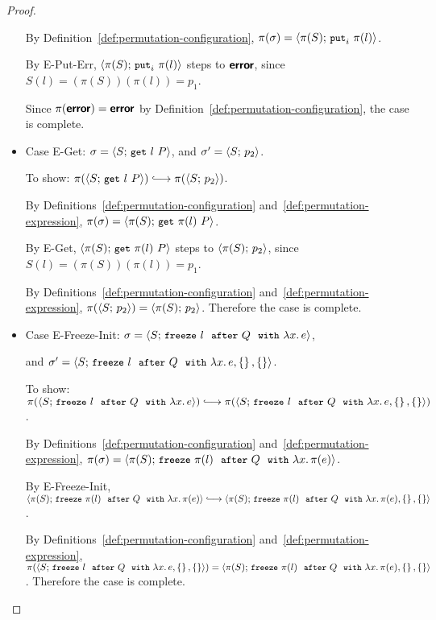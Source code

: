 \begin{proof}
\begin{itemize}
      By Definition~\ref{def:permutation-configuration}, $\pi(\sigma) =
      \langle \pi(S);\, \mbox{\small{\texttt{put}}}_i~\pi(l) \rangle$.

      By {\sc E-Put-Err}, $\langle \pi(S);\, \mbox{\small{\texttt{put}}}_i~\pi(l) \rangle$ steps to
      $\textbf{\textsf{error}}$, since $S(l) = (\pi(S))(\pi(l)) = p_1$.

      Since $\pi(\textbf{\textsf{error}}) = \textbf{\textsf{error}}$ by
      Definition~\ref{def:permutation-configuration}, the case is
      complete.
    \item Case {\sc E-Get}: $\sigma = \langle S;\, \mbox{\small{\texttt{get}}}~l~P \rangle$, and
      $\sigma' = \langle S;\, p_2 \rangle$.

      To show: $\pi(\config{S}{\getexp{l}{P}}) \parstepsto
      \pi(\config{S}{p_2})$.

      By Definitions~\ref{def:permutation-configuration}
      and~\ref{def:permutation-expression}, $\pi(\sigma) =
      \langle \pi(S);\, \mbox{\small{\texttt{get}}}~\pi(l)~P \rangle$.

      By {\sc E-Get}, $\langle \pi(S);\, \mbox{\small{\texttt{get}}}~\pi(l)~P \rangle$ steps to
      $\langle \pi(S);\, p_2 \rangle$, since $S(l) = (\pi(S))(\pi(l)) = p_1$.

      By Definitions~\ref{def:permutation-configuration}
      and~\ref{def:permutation-expression}, $\pi(\langle S;\, p_2 \rangle) =
      \langle \pi(S);\, p_2 \rangle$.  Therefore the case is complete.
    \item Case {\sc E-Freeze-Init}: $\sigma =
      \langle S;\, \mbox{\small{\texttt{freeze}}}~l~~{\mbox{\small{\texttt{after}}}}~Q~~{\mbox{\small{\texttt{with}}}}~\lambda x.\,e \rangle$,

      and $\sigma' =
      \langle S;\, \mbox{\small{\texttt{freeze}}}~l~~{\mbox{\small{\texttt{after}}}}~Q~~{\mbox{\small{\texttt{with}}}}~\lambda x.\,e, \left\{\right\}, \left\{\right\} \rangle$.

      To show: $\pi(\config{S}{\freezeafter{l}{Q}{\lam{x}{e}}})
      \parstepsto \\
      \pi(\config{S}{\freezeafterfull{l}{Q}{\lam{x}{e}}{\setof{}}{\setof{}}})$.

      By Definitions~\ref{def:permutation-configuration}
      and~\ref{def:permutation-expression}, $\pi(\sigma) =
      \langle \pi(S);\, \mbox{\small{\texttt{freeze}}}~\pi(l)~~{\mbox{\small{\texttt{after}}}}~Q~~{\mbox{\small{\texttt{with}}}}~\lambda x.\,\pi(e) \rangle$.

      By {\sc E-Freeze-Init},
      $\config{\pi(S)}{\freezeafter{\pi(l)}{Q}{\lam{x}{\pi(e)}}}
      \parstepsto \\
      \config{\pi(S)}{\freezeafterfull{\pi(l)}{Q}{\lam{x}{\pi(e)}}{\setof{}}{\setof{}}}$.

      By Definitions~\ref{def:permutation-configuration}
      and~\ref{def:permutation-expression},
      $\pi(\langle S;\, \mbox{\small{\texttt{freeze}}}~l~~{\mbox{\small{\texttt{after}}}}~Q~~{\mbox{\small{\texttt{with}}}}~\lambda x.\,e, \left\{\right\}, \left\{\right\} \rangle)
      = \\
      \langle \pi(S);\, \mbox{\small{\texttt{freeze}}}~\pi(l)~~{\mbox{\small{\texttt{after}}}}~Q~~{\mbox{\small{\texttt{with}}}}~\lambda x.\,\pi(e), \left\{\right\}, \left\{\right\} \rangle$.
      Therefore the case is complete.


\end{itemize}
\end{proof}
